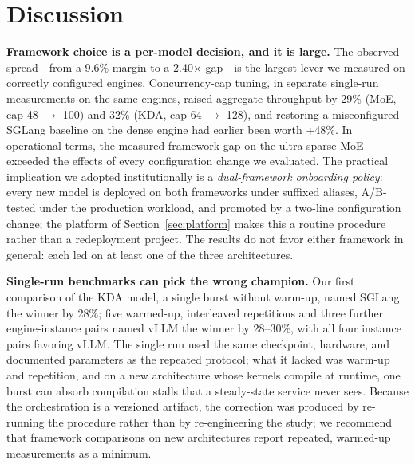 \documentclass[11pt]{article}
\begin{document}
\section{Discussion}

\textbf{Framework choice is a per-model decision, and it is large.} The observed spread---from a 9.6\% margin to a 2.40$\times$ gap---is the largest lever we measured on correctly configured engines. Concurrency-cap tuning, in separate single-run measurements on the same engines, raised aggregate throughput by 29\% (MoE, cap 48 $\rightarrow$ 100) and 32\% (KDA, cap 64 $\rightarrow$ 128), and restoring a misconfigured SGLang baseline on the dense engine had earlier been worth +48\%. In operational terms, the measured framework gap on the ultra-sparse MoE exceeded the effects of every configuration change we evaluated. The practical implication we adopted institutionally is a \emph{dual-framework onboarding policy}: every new model is deployed on both frameworks under suffixed aliases, A/B-tested under the production workload, and promoted by a two-line configuration change; the platform of Section~\ref{sec:platform} makes this a routine procedure rather than a redeployment project. The results do not favor either framework in general: each led on at least one of the three architectures.

\textbf{Single-run benchmarks can pick the wrong champion.} Our first comparison of the KDA model, a single burst without warm-up, named SGLang the winner by 28\%; five warmed-up, interleaved repetitions and three further engine-instance pairs named vLLM the winner by 28--30\%, with all four instance pairs favoring vLLM. The single run used the same checkpoint, hardware, and documented parameters as the repeated protocol; what it lacked was warm-up and repetition, and on a new architecture whose kernels compile at runtime, one burst can absorb compilation stalls that a steady-state service never sees. Because the orchestration is a versioned artifact, the correction was produced by re-running the procedure rather than by re-engineering the study; we recommend that framework comparisons on new architectures report repeated, warmed-up measurements as a minimum.
\end{document}
